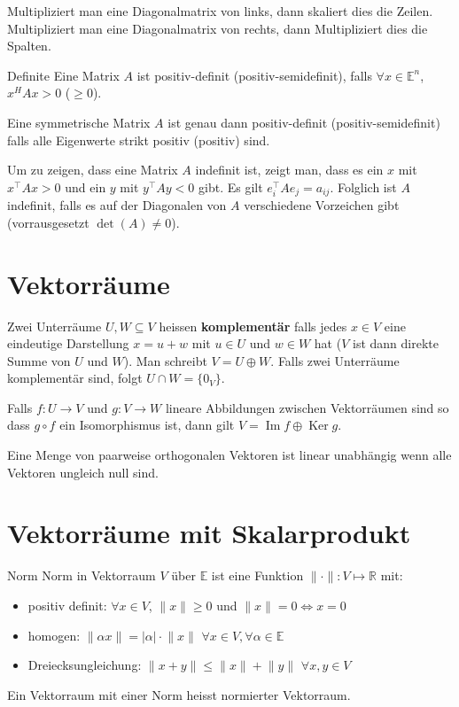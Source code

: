 \documentclass[a4paper,10pt]{article}
\def\E{\mathbb{E}}
\begin{document}
Multipliziert man eine Diagonalmatrix von links, dann skaliert dies die Zeilen. Multipliziert man eine Diagonalmatrix von rechts, dann Multipliziert dies die Spalten.


\begin{subbox}{Definite}
  Eine Matrix $A$ ist positiv-definit (positiv-semidefinit), falls $\forall x \in \E^n$, $x^H A x > 0$ ($\geq 0$).
\end{subbox}

Eine symmetrische Matrix $A$ ist genau dann positiv-definit (positiv-semidefinit) falls alle Eigenwerte strikt positiv (positiv) sind.

Um zu zeigen, dass eine Matrix $A$ indefinit ist, zeigt man, dass es ein $x$ mit $x^\top A x > 0$ und ein $y$ mit $y^\top A y < 0$ gibt. Es gilt $e_i^\top A e_j = a_{ij}$. Folglich ist $A$ indefinit, falls es auf der Diagonalen von $A$ verschiedene Vorzeichen gibt (vorrausgesetzt $\det(A) \neq 0$).


\section{Vektorräume}

Zwei Unterräume $U, W \subseteq V$ heissen \textbf{komplementär} falls jedes $x \in V$ eine eindeutige Darstellung $x = u + w$ mit $u \in U$ und $w \in W$ hat ($V$ ist dann direkte Summe von $U$ und $W$). Man schreibt $V = U \oplus W$. Falls zwei Unterräume komplementär sind, folgt $U \cap W = \{0_V\}$.

Falls  $f: U \rightarrow V$ und $g: V \rightarrow W$ lineare Abbildungen zwischen Vektorräumen sind so dass $ g \circ f$ ein Isomorphismus ist, dann gilt $V = \operatorname{Im}f \oplus \operatorname{Ker} g$.

Eine Menge von paarweise orthogonalen Vektoren ist linear unabhängig wenn alle Vektoren ungleich null sind.

\section{Vektorräume mit Skalarprodukt}

\begin{subbox}{Norm}
  Norm in Vektorraum $V$ über $\mathbb{E}$ ist eine Funktion $\lVert \cdot \rVert: V \mapsto \mathbb{R}$ mit:
  \begin{itemize}
    \item positiv definit: $\forall x \in V$, $\lVert x \rVert \geq 0$ und $\lVert x \rVert = 0 \Leftrightarrow x = 0$
    \item homogen: $\lVert \alpha x \rVert = \lvert \alpha \rvert \cdot \lVert x \rVert$ $\forall x \in V, \forall \alpha \in \mathbb{E}$
    \item Dreiecksungleichung: $\lVert x + y \rVert \leq \lVert x \rVert + \lVert y \rVert$ $\forall x, y \in V$
  \end{itemize}
  Ein Vektorraum mit einer Norm heisst normierter Vektorraum.
\end{subbox}
\end{document}

